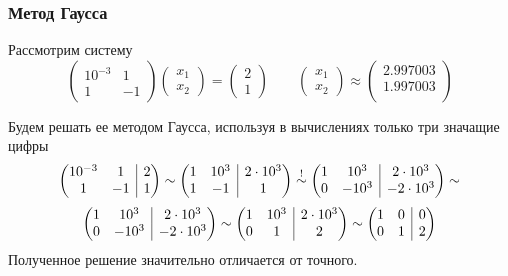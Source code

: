 \documentclass[apectratio=43,unicode]{beamer}
\begin{document}
\begin{frame}\frametitle{Метод Гаусса}
	Рассмотрим систему
	\[
	\begin{pmatrix}
		10^{-3}&1\\
		1&-1
	\end{pmatrix}
	\begin{pmatrix}
		x_1\\x_2
	\end{pmatrix} =
	\begin{pmatrix}
		2\\1
	\end{pmatrix}
	\qquad
	\begin{pmatrix}
		x_1\\x_2
	\end{pmatrix} \approx
	\begin{pmatrix}
		2.997003\\
		1.997003\\
	\end{pmatrix}
	\]

	Будем решать ее методом Гаусса, используя в вычислениях только три значащие цифры
	\[
	\left(
	\begin{array}{@{}cc|c@{}}
		10^{-3}&1&2\\
		1&-1&1
	\end{array}
	\right)
	\sim
	\left(
	\begin{array}{@{}cc|c@{}}
		1&10^3&2\cdot10^3\\
		1&-1&1
	\end{array}
	\right)
	\stackrel{!}{\sim}
	\left(
	\begin{array}{@{}cc|c@{}}
		1&10^3&2\cdot10^3\\
		0&-10^3&-2\cdot10^3\\
	\end{array}
	\right)
	\sim
	\]
	\[
	\left(
	\begin{array}{@{}cc|c@{}}
		1&10^3&2\cdot10^3\\
		0&-10^3&-2\cdot10^3\\
	\end{array}
	\right)
	\sim
	\left(
	\begin{array}{@{}cc|c@{}}
		1&10^3&2\cdot10^3\\
		0&1&2\\
	\end{array}
	\right)
	\sim
	\left(
	\begin{array}{@{}cc|c@{}}
		1&0&0\\
		0&1&2\\
	\end{array}
	\right)
	\]
	Полученное решение значительно отличается от точного.
\end{frame}
\end{document}
